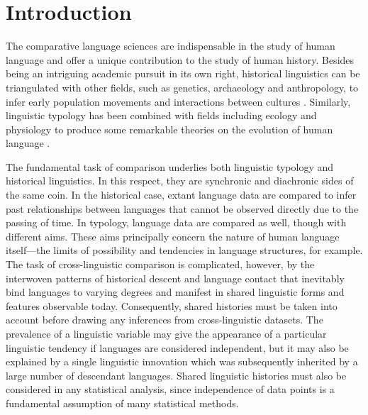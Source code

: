 \hypertarget{pcm-intro}{%
\section{Introduction}\label{pcm-intro}}

The comparative language sciences are indispensable in the study of human language and offer a unique contribution to the study of human history. Besides being an intriguing academic pursuit in its own right, historical linguistics can be triangulated with other fields, such as genetics, archaeology and anthropology, to infer early population movements and interactions between cultures \autocites[e.g.][]{hunley_genetic_2008}{gray_language_2009}{bouckaert_mapping_2012}{malaspinas_genomic_2016}{bouckaert_origin_2018}. Similarly, linguistic typology has been combined with fields including ecology and physiology to produce some remarkable theories on the evolution of human language \autocites[e.g.][]{everett_climate_2015}{everett_languages_2017}{bentz_evolution_2018}{blasi_human_2019}.

The fundamental task of comparison underlies both linguistic typology and historical linguistics. In this respect, they are synchronic and diachronic sides of the same coin. In the historical case, extant language data are compared to infer past relationships between languages that cannot be observed directly due to the passing of time. In typology, language data are compared as well, though with different aims. These aims principally concern the nature of human language itself---the limits of possibility and tendencies in language structures, for example. The task of cross-linguistic comparison is complicated, however, by the interwoven patterns of historical descent and language contact that inevitably bind languages to varying degrees and manifest in shared linguistic forms and features observable today. Consequently, shared histories must be taken into account before drawing any inferences from cross-linguistic datasets. The prevalence of a linguistic variable may give the appearance of a particular linguistic tendency if languages are considered independent, but it may also be explained by a single linguistic innovation which was subsequently inherited by a large number of descendant languages. Shared linguistic histories must also be considered in any statistical analysis, since independence of data points is a fundamental assumption of many statistical methods.

